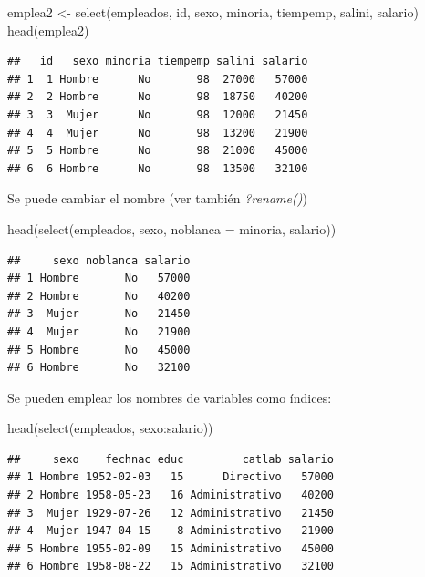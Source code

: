 \documentclass[
]{book}
\newenvironment{Shaded}{\begin{snugshade}}{\end{snugshade}}
\newcommand{\AttributeTok}[1]{\textcolor[rgb]{0.77,0.63,0.00}{#1}}
\newcommand{\FunctionTok}[1]{\textcolor[rgb]{0.00,0.00,0.00}{#1}}
\newcommand{\NormalTok}[1]{#1}
\newcommand{\OtherTok}[1]{\textcolor[rgb]{0.56,0.35,0.01}{#1}}
\newcommand{\SpecialCharTok}[1]{\textcolor[rgb]{0.00,0.00,0.00}{#1}}
\theoremstyle{break}
\theoremstyle{nonumberplain}
\begin{document}
\begin{Shaded}
\begin{Highlighting}[]
\NormalTok{emplea2 }\OtherTok{\textless{}{-}} \FunctionTok{select}\NormalTok{(empleados, id, sexo, minoria, tiempemp, salini, salario)}
\FunctionTok{head}\NormalTok{(emplea2)}
\end{Highlighting}
\end{Shaded}

\begin{verbatim}
##   id   sexo minoria tiempemp salini salario
## 1  1 Hombre      No       98  27000   57000
## 2  2 Hombre      No       98  18750   40200
## 3  3  Mujer      No       98  12000   21450
## 4  4  Mujer      No       98  13200   21900
## 5  5 Hombre      No       98  21000   45000
## 6  6 Hombre      No       98  13500   32100
\end{verbatim}

Se puede cambiar el nombre (ver también \emph{?rename()})

\begin{Shaded}
\begin{Highlighting}[]
\FunctionTok{head}\NormalTok{(}\FunctionTok{select}\NormalTok{(empleados, sexo, }\AttributeTok{noblanca =}\NormalTok{ minoria, salario))}
\end{Highlighting}
\end{Shaded}

\begin{verbatim}
##     sexo noblanca salario
## 1 Hombre       No   57000
## 2 Hombre       No   40200
## 3  Mujer       No   21450
## 4  Mujer       No   21900
## 5 Hombre       No   45000
## 6 Hombre       No   32100
\end{verbatim}

Se pueden emplear los nombres de variables como índices:

\begin{Shaded}
\begin{Highlighting}[]
\FunctionTok{head}\NormalTok{(}\FunctionTok{select}\NormalTok{(empleados, sexo}\SpecialCharTok{:}\NormalTok{salario))}
\end{Highlighting}
\end{Shaded}

\begin{verbatim}
##     sexo    fechnac educ         catlab salario
## 1 Hombre 1952-02-03   15      Directivo   57000
## 2 Hombre 1958-05-23   16 Administrativo   40200
## 3  Mujer 1929-07-26   12 Administrativo   21450
## 4  Mujer 1947-04-15    8 Administrativo   21900
## 5 Hombre 1955-02-09   15 Administrativo   45000
## 6 Hombre 1958-08-22   15 Administrativo   32100
\end{verbatim}
\end{document}
